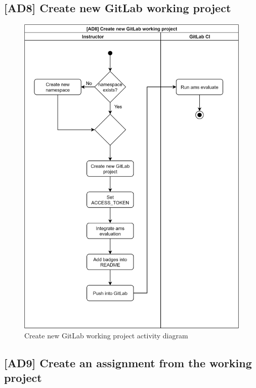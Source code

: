 \subsection{{[}AD8{]} Create new GitLab working project} \label{ssec:ad8}

\begin{figure}[H]
    \centering
    \includegraphics[width=\textwidth,height=\textheight,keepaspectratio]{Figures/ad/ad8.png}
    \caption{Create new GitLab working project activity diagram}
\end{figure}

\subsection{{[}AD9{]} Create an assignment from the working project} \label{ssec:ad9}

